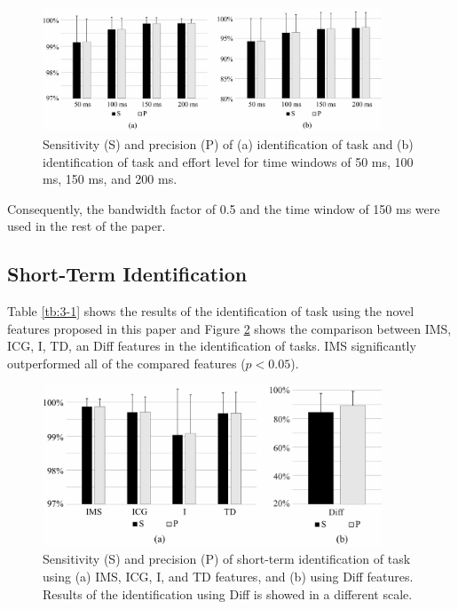 \begin{figure}[ht]
\centering
\includegraphics[width=0.9\textwidth]{Images/figure3_5.png}
\caption{Sensitivity (S) and precision (P) of (a) identification of task and (b) identification of task and effort level for time windows of 50 ms, 100 ms, 150 ms, and 200 ms.}
\label{fig:3-5}
\end{figure}   

Consequently, the bandwidth factor of 0.5 and the time window of 150 ms were used in the rest of the paper.

\subsection{Short-Term Identification}
Table \ref{tb:3-1} shows the results of the identification of task using the novel features proposed in this paper and Figure \ref{fig:3-6} shows the comparison between IMS, ICG, I, TD, an Diff features in the identification of tasks. IMS significantly outperformed all of the compared features ($p < 0.05$).

\begin{figure}[ht]
\centering
\includegraphics[width=0.9\textwidth]{Images/figure3_6.png}
\caption{Sensitivity (S) and precision (P) of short-term identification of task using (a) IMS, ICG, I, and TD features, and (b) using Diff features. Results of the identification using Diff is showed in a different scale.}
\label{fig:3-6}
\end{figure}   

